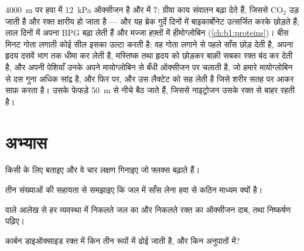 \begin{example}[ऊँचाई और गहराई]\label{ex:b1:gas-exchange:altitudediving}
\qty{4000}{m} पर हवा में \qty{12}{kPa} ऑक्सीजन है और  में
\qty{7}{}: ग्रीवा काय संवातन बढ़ा देते हैं, जिससे
$\mathrm{CO_2}$ उड़ जाती है और रक्त क्षारीय हो जाता है --- और यह ब्रेक
गुर्दे दिनों में बाइकार्बोनेट उत्सर्जित करके छोड़ते हैं; लाल 
दिनों में अपना BPG बढ़ा लेती हैं और मज्जा हफ़्तों में हीमोग्लोबिन
(\cref{ch:b1:proteins})। बीस मिनट गोता लगाती कोई सील इसका
उल्टा करती है: वह गोता लगाने से पहले साँस छोड़ देती है, अपना हृदय दसवें
भाग तक धीमा कर लेती है, मस्तिष्क तथा हृदय को छोड़कर बाक़ी सबका रक्त बंद
कर देती है, और अपनी पेशियाँ उनके अपने मायोग्लोबिन से बँधी ऑक्सीजन पर
चलाती है, जो हमारे मायोग्लोबिन से दस गुना अधिक सांद्र है, और फिर 
पर, और उस लैक्टेट को सह लेती है जिसे शरीर सतह पर आकर साफ़ करता है।
उसके फेफड़े \qty{50}{m} से नीचे बैठ जाते हैं, जिससे नाइट्रोजन उसके रक्त
से बाहर रहती है।
\end{example}

\section{अभ्यास}

\begin{exercise}[$\star$]\label{exo:b1:gas-exchange:1}
किसी  के लिए  बताइए और वे चार लक्षण गिनाइए जो
फ्लक्स बढ़ाते हैं।
\end{exercise}

\begin{exercise}[$\star$]\label{exo:b1:gas-exchange:2}
तीन संख्याओं की सहायता से समझाइए कि जल में साँस लेना हवा से कठिन माध्यम
क्यों है।
\end{exercise}

\begin{exercise}[$\star$]\label{exo:b1:gas-exchange:3}
 वाले आलेख से हर व्यवस्था में निकलते जल का और निकलते रक्त का
ऑक्सीजन दाब, तथा निष्कर्षण पढ़िए।
\end{exercise}

\begin{exercise}[$\star$]\label{exo:b1:gas-exchange:4}
कार्बन डाइऑक्साइड रक्त में किन तीन रूपों में ढोई जाती है, और किन
अनुपातों में?
\end{exercise}

